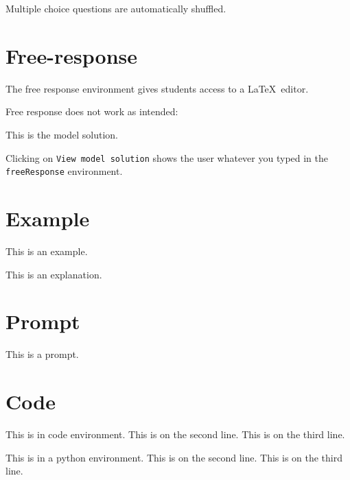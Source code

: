 \documentclass{ximera}
\begin{document}
\begin{remark}
  Multiple choice questions are automatically shuffled.
\end{remark}



\section{Free-response}

The free response environment gives students access to a \LaTeX\ editor. 

Free response does not work as intended:

\begin{freeResponse}
  This is the model solution.
\end{freeResponse}

\begin{remark}
Clicking on \verb!View model solution! shows the user
whatever you typed in the  \verb!freeResponse! environment.
\end{remark}

\section{Example}

\begin{example}
This is an example.
\end{example}
\begin{explanation}
This is an explanation.
\end{explanation}

\section{Prompt}

\begin{prompt}
This is a prompt.
\end{prompt}

\section{Code}

\begin{code}
This is in code environment.
This is on the second line.
This is on the third line.
\end{code}

\begin{python}
This is in a python environment.
This is on the second line.
This is on the third line.
\end{python}
\end{document}
